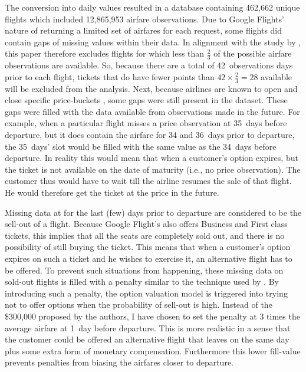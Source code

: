 The conversion into daily values resulted in a database containing 462,662 unique flights which included 12,865,953 airfare observations. Due to Google Flights' nature of returning a limited set of airfares for each request, some flights did contain gaps of missing values within their data. In alignment with the study by , this paper therefore excludes flights for which less than $\frac{2}{3}$ of the possible airfare observations are available. So, because there are a total of 42~observations days prior to each flight, tickets that do have fewer points than $42 \times \frac{2}{3} = 28$ available will be excluded from the analysis. Next, because airlines are known to open and close specific price-buckets \cite{mcgill1999revenue}, some gaps were still present in the dataset. These gaps were filled with the data available from observations made in the future. For example, when a particular flight misses a price observation at 35~days before departure, but it does contain the airfare for 34 and 36~days prior to departure, the 35~days' slot would be filled with the same value as the 34~days before departure. In reality this would mean that when a customer's option expires, but the ticket is not available on the date of maturity (i.e., no price observation). The customer thus would have to wait till the airline resumes the sale of that flight. He would therefore get the ticket at the price in the future.

Missing data at for the last (few) days prior to departure are considered to be the sell-out of a flight. Because Google Flight's also offers Business and First class tickets, this implies that all the seats are completely sold out, and there is no possibility of still buying the ticket. This means that when a customer's option expires on such a ticket and he wishes to exercise it, an alternative flight has to be offered. To prevent such situations from happening, these missing data on sold-out flights is filled with a penalty similar to the technique used by . By introducing such a penalty, the option valuation model is triggered into trying not to offer options when the probability of sell-out is high. Instead of the \$300,000 proposed by the authors, I have chosen to set the penalty at 3 times the average airfare at 1~day before departure. This is more realistic in a sense that the customer could be offered an alternative flight that leaves on the same day plus some extra form of monetary compensation. Furthermore this lower fill-value prevents penalties from biasing the airfares closer to departure.

